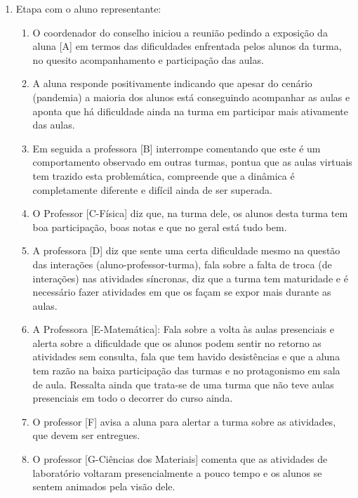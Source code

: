 \begin{enumerate}
	\item	Etapa com o aluno representante:
	\begin{enumerate}
		\item O coordenador do conselho iniciou a reunião pedindo a exposição da aluna [A] em termos das dificuldades enfrentada pelos alunos da turma, no quesito acompanhamento e participação das aulas.
		
		\item A aluna responde positivamente indicando que apesar do cenário (pandemia) a maioria dos alunos está conseguindo acompanhar as aulas e aponta que há dificuldade ainda na turma em participar mais ativamente das aulas.
		
		\item Em seguida a professora [B] interrompe comentando que este é um comportamento observado em outras turmas, pontua que as aulas virtuais tem trazido esta problemática, compreende que a dinâmica é completamente diferente e difícil ainda de ser superada.
		
		\item O Professor [C-Física] diz que, na turma dele, os alunos desta turma tem boa participação, boas notas e que no geral está tudo bem.
		
		\item A professora [D] diz que sente uma certa dificuldade mesmo na questão das interações (aluno-professor-turma), fala sobre a falta de troca (de interações) nas atividades síncronas, diz que a turma tem maturidade e é necessário fazer atividades em que os façam se expor mais durante as aulas.
		
		\item A Professora [E-Matemática]: Fala sobre a volta às aulas presenciais e alerta sobre a dificuldade que os alunos podem sentir no retorno as atividades sem consulta, fala que tem havido desistências e que a aluna tem razão na baixa participação das turmas e no protagonismo em sala de aula. Ressalta ainda que trata-se de uma turma que não teve aulas presenciais em todo o decorrer do curso ainda.
		
		\item O professor [F] avisa a aluna para alertar a turma sobre as atividades, que devem ser entregues.
		
		\item O professor [G-Ciências dos Materiais] comenta que as atividades de laboratório voltaram presencialmente a pouco tempo e os alunos se sentem animados pela visão dele.
		

\end{enumerate}
\end{enumerate}
